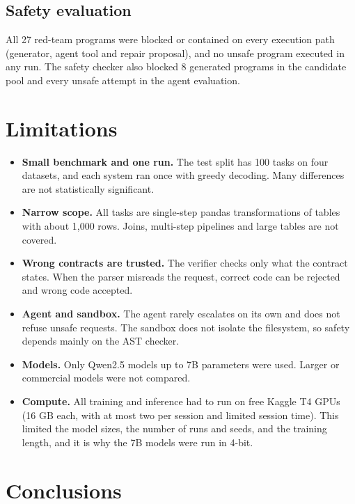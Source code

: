 \documentclass[11pt]{article}
\providecommand{\tightlist}{\setlength{\itemsep}{0pt}\setlength{\parskip}{0pt}}
\begin{document}
\subsection{Safety evaluation}

All 27 red-team programs were blocked or contained on every execution
path (generator, agent tool and repair proposal), and no unsafe program
executed in any run. The safety checker also blocked 8 generated
programs in the candidate pool and every unsafe attempt in the agent
evaluation.

\section{Limitations}

\begin{itemize}
\tightlist
\item
  \textbf{Small benchmark and one run.} The test split has 100 tasks on
  four datasets, and each system ran once with greedy decoding. Many
  differences are not statistically significant.
\item
  \textbf{Narrow scope.} All tasks are single-step pandas
  transformations of tables with about 1,000 rows. Joins, multi-step
  pipelines and large tables are not covered.
\item
  \textbf{Wrong contracts are trusted.} The verifier checks only what
  the contract states. When the parser misreads the request, correct
  code can be rejected and wrong code accepted.
\item
  \textbf{Agent and sandbox.} The agent rarely escalates on its own and
  does not refuse unsafe requests. The sandbox does not isolate the
  filesystem, so safety depends mainly on the AST checker.
\item
  \textbf{Models.} Only Qwen2.5 models up to 7B parameters were used.
  Larger or commercial models were not compared.
\item
  \textbf{Compute.} All training and inference had to run on free Kaggle
  T4 GPUs (16 GB each, with at most two per session and limited session
  time). This limited the model sizes, the number of runs and seeds, and
  the training length, and it is why the 7B models were run in 4-bit.
\end{itemize}

\section{Conclusions}
\end{document}
